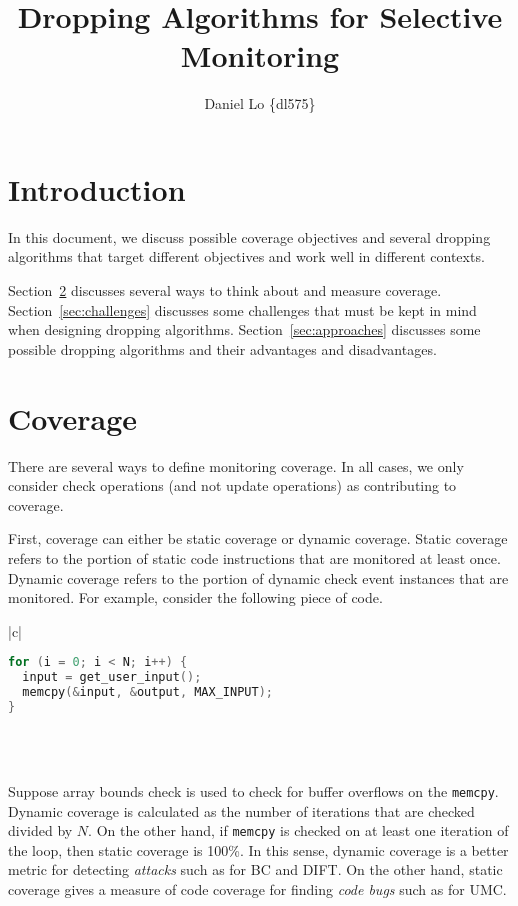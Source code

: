 \documentclass[11pt, letterpaper]{article}
\title{Dropping Algorithms for Selective Monitoring}
\author{Daniel Lo \{dl575\}}
\begin{document}

\section{Introduction}
In this document, we discuss possible coverage objectives and several dropping
algorithms that target different objectives and work well in different
contexts.

Section~\ref{sec:coverage} discusses several ways to think about and measure
coverage. Section~\ref{sec:challenges} discusses some challenges that must be
kept in mind when designing dropping algorithms. Section~\ref{sec:approaches}
discusses some possible dropping algorithms and their advantages and
disadvantages.

\section{Coverage}
\label{sec:coverage}

There are several ways to define monitoring coverage. In all cases, we only
consider check operations (and not update operations) as contributing to
coverage.

First, coverage can either be static coverage or dynamic coverage. Static
coverage refers to the portion of static code instructions that are monitored
at least once. Dynamic coverage refers to the portion of dynamic check event
instances that are monitored. For example, consider the following piece of code.

\begin{center}
\begin{tabular}{|c|}
\hline
\\
\begin{lstlisting}[language=c]
for (i = 0; i < N; i++) {
  input = get_user_input();
  memcpy(&input, &output, MAX_INPUT);
}
\end{lstlisting}
\\\\ \hline
\end{tabular}
\end{center}

Suppose array bounds check is used to check for buffer overflows on the {\tt memcpy}.
Dynamic coverage is calculated as the number of iterations that are checked
divided by $N$. On the other hand, if {\tt memcpy} is checked on at least one
iteration of the loop, then static coverage is 100\%. In this sense, dynamic
coverage is a better metric for detecting \emph{attacks} such as for BC and
DIFT. On the other hand, static coverage gives a measure of code coverage for
finding \emph{code bugs} such as for UMC.
\end{document}
